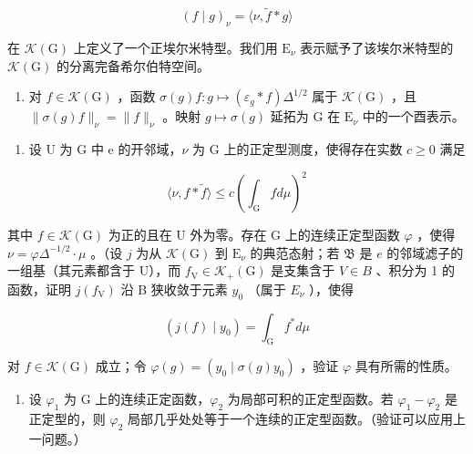\[
(f \mid g) _ {\nu} = \langle \nu , \widetilde {f} * g \rangle
\]

在 \(\mathcal{K}(\mathrm{G})\) 上定义了一个正埃尔米特型。我们用 \(\mathrm{E}_{\nu}\) 表示赋予了该埃尔米特型的 \(\mathcal{K}(\mathrm{G})\) 的分离完备希尔伯特空间。

\begin{enumerate}
\def\labelenumi{\alph{enumi})}
\setcounter{enumi}{3}
\tightlist
\item
  对 \(f \in \mathcal{K}(\mathrm{G})\) ，函数 \(\sigma(g)f \colon g \mapsto (\varepsilon_g * f)\Delta^{1/2}\) 属于 \(\mathcal{K}(\mathrm{G})\) ，且 \(\| \sigma(g)f \|_{\nu} = \|f\|_{\nu}\) 。映射 \(g \mapsto \sigma(g)\) 延拓为 G 在 \(\mathrm{E}_{\nu}\) 中的一个酉表示。
\end{enumerate}

\begin{enumerate}
\def\labelenumi{\alph{enumi})}
\setcounter{enumi}{4}
\tightlist
\item
  设 U 为 G 中 e 的开邻域，\(\nu\) 为 G 上的正定型测度，使得存在实数 \(c \geqslant 0\) 满足
\end{enumerate}

\[
\langle \nu , f * \widetilde {f} \rangle \leqslant c \left(\int_ {\mathrm{G}} f d \mu\right) ^ {2}
\]

  其中 \(f \in \mathcal{K}(\mathrm{G})\) 为正的且在 U 外为零。存在 G 上的连续正定型函数 \(\varphi\) ，使得 \(\nu = \varphi \Delta^{-1/2} \cdot \mu\) 。（设 \(j\) 为从 \(\mathcal{K}(\mathrm{G})\) 到 \(\mathrm{E}_{\nu}\) 的典范态射；若 \(\mathfrak{B}\) 是 \(e\) 的邻域滤子的一组基（其元素都含于 U），而 \(f_{\mathrm{V}} \in \mathcal{K}_{+}(\mathrm{G})\) 是支集含于 \(V \in B\) 、积分为 1 的函数，证明 \(j(f_{\mathrm{V}})\) 沿 B 狭收敛于元素 \(y_{0}\) （属于 \(E_{\nu}\) ），使得

\[
(j (f) \mid y _ {0}) = \int_ {\mathrm{G}} f ^ {*} d \mu
\]

对 \(f \in \mathcal{K}(\mathrm{G})\) 成立；令 \(\varphi(g) = (y_0 \mid \sigma(g)y_0)\) ，验证 \(\varphi\) 具有所需的性质。

\begin{enumerate}
\def\labelenumi{\alph{enumi})}
\setcounter{enumi}{5}
\tightlist
\item
  设 \(\varphi_{1}\) 为 G 上的连续正定函数，\(\varphi_{2}\) 为局部可积的正定型函数。若 \(\varphi_{1}-\varphi_{2}\) 是正定型的，则 \(\varphi_{2}\) 局部几乎处处等于一个连续的正定型函数。（验证可以应用上一问题。）
\end{enumerate}

